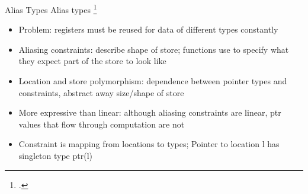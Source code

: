\documentclass[aspectratio=169]{beamer}
\begin{document}

\begin{frame}{Alias Types}
  Alias types \footcite{smith_alias_2000}
    \begin{itemize}
        \item Problem: registers must be reused for data of different types constantly
        \item Aliasing constraints: describe shape of store; functions use to specify what they expect part of the store to look like
        \item Location and store polymorphism: dependence between pointer types and constraints, abstract away size/shape of store
        \item More expressive than linear: although aliasing constraints are linear, ptr values that flow through computation are not
        \item Constraint is mapping from locations to types; Pointer to location l has singleton type ptr(l)
    \end{itemize}
\end{frame}
\end{document}
